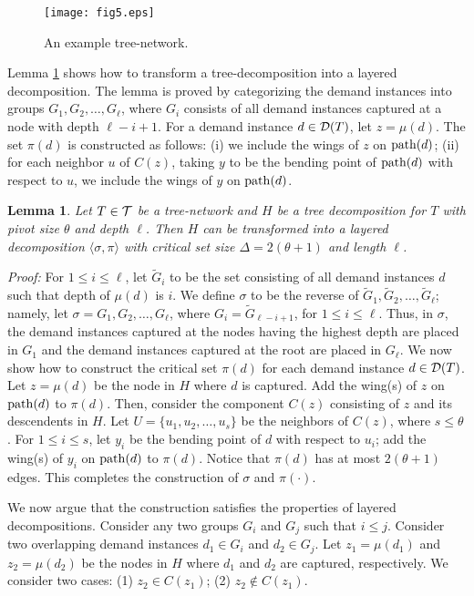 \documentclass[11pt]{article}
\newtheorem{lemma}[theorem]{\bf Lemma}
\newcommand{\proof} {{\it Proof: }}
\newcommand{\calT} {{\cal T}}
\newcommand{\calD} {{\cal D}}
\newcommand{\wt}[1] {\widetilde{#1}}
\newcommand{\mypath} {{\rm path}}
\newcommand{\pair}[2] {\langle #1,#2 \rangle}
\begin{document}
\begin{figure}
\centering
\texttt{[image: fig5.eps]}
\caption{
An example tree-network. 
}
\label{fig:5}
\end{figure}

Lemma \ref{lem:CCC} shows how to transform a tree-decomposition into a layered decomposition.
The lemma is proved by categorizing the demand instances into groups
$G_1, G_2, \ldots, G_{\ell}$, where $G_i$ consists of all demand instances
captured at a node with depth $\ell-i+1$.
For a demand instance $d\in \calD(T)$, let $z=\mu(d)$.
The set $\pi(d)$ is constructed as follows:
(i) we include the wings of $z$ on $\mypath(d)$;
(ii) for each neighbor $u$ of $C(z)$, taking $y$ to be the bending point of $\mypath(d)$
with respect to $u$, we include the wings of $y$ on $\mypath(d)$.

\begin{lemma}
\label{lem:CCC}
Let $T\in \calT$ be a tree-network and $H$ be a tree decomposition for $T$
with pivot size $\theta$ and depth $\ell$. Then $H$ can be transformed into a layered
decomposition $\pair{\sigma}{\pi}$ with critical set size $\Delta=2(\theta+1)$
and length $\ell$.
\end{lemma}
\proof
For $1\leq i\leq \ell$, let $\wt{G}_i$ to be the set consisting of all demand instances 
$d$ such that depth of $\mu(d)$ is $i$. 
We define $\sigma$ to be the reverse of $\wt{G}_1, \wt{G}_2, \ldots, \wt{G}_{\ell}$;
namely, let $\sigma=G_1, G_2, \ldots, G_{\ell}$, where $G_i = \wt{G}_{\ell-i+1}$, for $1\leq i\leq \ell$.
Thus, in $\sigma$, the demand instances captured at the nodes having the highest depth are placed in $G_1$
and the demand instances captured at the root are placed in $G_{\ell}$.
We now show how to construct the critical set $\pi(d)$ for each demand instance $d\in \calD(T)$.
Let $z=\mu(d)$ be the node in $H$ where $d$ is captured.
Add the wing(s) of $z$ on $\mypath(d)$ to $\pi(d)$.
Then, consider the component $C(z)$ consisting of $z$ and its descendents in $H$.
Let $U=\{u_1, u_2, \ldots, u_s\}$ be the neighbors of $C(z)$, where $s\leq \theta$.
For $1\leq i\leq s$, let $y_i$ be the bending point of $d$ with respect to $u_i$;
add the wing(s) of $y_i$ on $\mypath(d)$ to $\pi(d)$. 
Notice that $\pi(d)$ has at most $2(\theta+1)$ edges.
This completes the construction of $\sigma$ and $\pi(\cdot)$.

We now argue that the construction satisfies the properties of layered decompositions.
Consider any two groups $G_i$ and $G_j$ such that $i\leq j$.
Consider two overlapping demand instances $d_1\in G_i$ and $d_2\in G_j$. 
Let $z_1=\mu(d_1)$ and $z_2=\mu(d_2)$ be the nodes in $H$ where $d_1$ and $d_2$ are captured, respectively.
We consider two cases: (1) $z_2 \in C(z_1)$; (2) $z_2\not\in C(z_1)$. 
\end{document}
